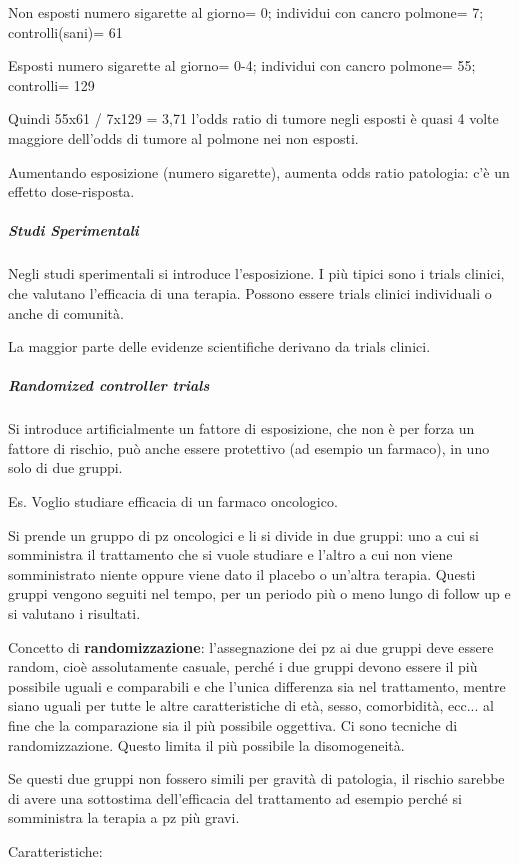 Non esposti numero sigarette al giorno= 0; individui con cancro polmone=
7; controlli(sani)= 61

Esposti numero sigarette al giorno= 0-4; individui con cancro polmone=
55; controlli= 129

Quindi 55x61 / 7x129 = 3,71 l'odds ratio di tumore negli esposti è quasi
4 volte maggiore dell'odds di tumore al polmone nei non esposti.

Aumentando esposizione (numero sigarette), aumenta odds ratio patologia:
c'è un effetto dose-risposta.

\subparagraph{Studi Sperimentali}


Negli studi sperimentali si introduce l'esposizione. I più tipici sono i
trials clinici, che valutano l'efficacia di una terapia. Possono essere
trials clinici individuali o anche di comunità.

La maggior parte delle evidenze scientifiche derivano da trials clinici.

\subparagraph{Randomized controller trials }


Si introduce artificialmente un fattore di esposizione, che non è per
forza un fattore di rischio, può anche essere protettivo (ad esempio un
farmaco), in uno solo di due gruppi.

Es. Voglio studiare efficacia di un farmaco oncologico.

Si prende un gruppo di pz oncologici e li si divide in due gruppi: uno a
cui si somministra il trattamento che si vuole studiare e l'altro a cui
non viene somministrato niente oppure viene dato il placebo o un'altra
terapia. Questi gruppi vengono seguiti nel tempo, per un periodo più o
meno lungo di follow up e si valutano i risultati.

Concetto di \textbf{randomizzazione}: l'assegnazione dei pz ai due
gruppi deve essere random, cioè assolutamente casuale, perché i due
gruppi devono essere il più possibile uguali e comparabili e che l'unica
differenza sia nel trattamento, mentre siano uguali per tutte le altre
caratteristiche di età, sesso, comorbidità, ecc... al fine che la
comparazione sia il più possibile oggettiva. Ci sono tecniche di
randomizzazione. Questo limita il più possibile la disomogeneità.

Se questi due gruppi non fossero simili per gravità di patologia, il
rischio sarebbe di avere una sottostima dell'efficacia del trattamento
ad esempio perché si somministra la terapia a pz più gravi.

Caratteristiche:


